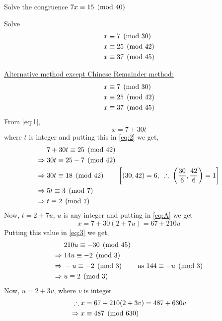 \documentclass[12pt,class=book,crop=false]{standalone}
\begin{document}
\begin{qn}
    Solve the congruence $ 7x\equiv 15 \pmod{40} $
\end{qn}
\begin{qn}[100E]
    Solve
    \begin{align*}
        x&\equiv 7 \pmod{30}\\
        x&\equiv 25 \pmod{42}\\
        x&\equiv 37 \pmod{45}
    \end{align*}
\end{qn}
\begin{soln}
    \underline{Alternative method except Chinese Remainder method:}
    \begin{align}
        x&\equiv 7 \pmod{30}\label{eq:1}\\
        x&\equiv 25 \pmod{42}\label{eq:2}\\
        x&\equiv 37 \pmod{45}\label{eq:3}
    \end{align}
    From \eqref{eq:1},
    \begin{equation}
        x=7+30t\label{eq:A}
    \end{equation}
    where $ t $ is integer and putting this in \eqref{eq:2} we get,
    \begin{align*}
        & 7+30t\equiv 25 \pmod{42}\\
        \Rightarrow\; & 30t\equiv 25-7 \pmod{42}\\
        \Rightarrow\; & 30t\equiv 18 \pmod{42}\qquad \left[(30,42)=6,\;\;\therefore\;\left( \frac{30}{6},\frac{42}{6} \right)=1\right]\\
        \Rightarrow\; & 5t\equiv 3 \pmod{7}\\
        \Rightarrow\; & t\equiv 2 \pmod{7}
    \end{align*}
    Now, $ t=2+7u $, $ u $ is any integer and putting in \eqref{eq:A} we get
    \[x=7+30(2+7u)=67+210u\]
    Putting this value in \eqref{eq:3} we get,
    \begin{align*}
        &210u\equiv -30 \pmod{45}\\
        \Rightarrow\; &14u\equiv -2 \pmod{3}\\
        \Rightarrow\; &-u\equiv -2 \pmod{3}\qquad\text{ as }144\equiv -u \pmod{3}\\
        \Rightarrow\; &u\equiv 2 \pmod{3}
    \end{align*}
    Now, $ u=2+3v $, where $ v $ is integer
    \begin{align*}
        \therefore\;&x=67+210(2+3v)=487+630v\\
        \Rightarrow\;&x\equiv 487 \pmod{630}
    \end{align*}
\end{soln}
\end{document}
